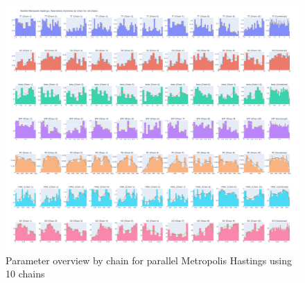 \begin{figure}[H]
    \centering
    \includegraphics[width=1\textwidth]{figures/parallel_mh/param_overview_10.png}
    \captionsetup{width=.8\textwidth}
    \caption{Parameter overview by chain for parallel Metropolis Hastings using 10 chains}
    \label{fig:enter-label}
\end{figure}

